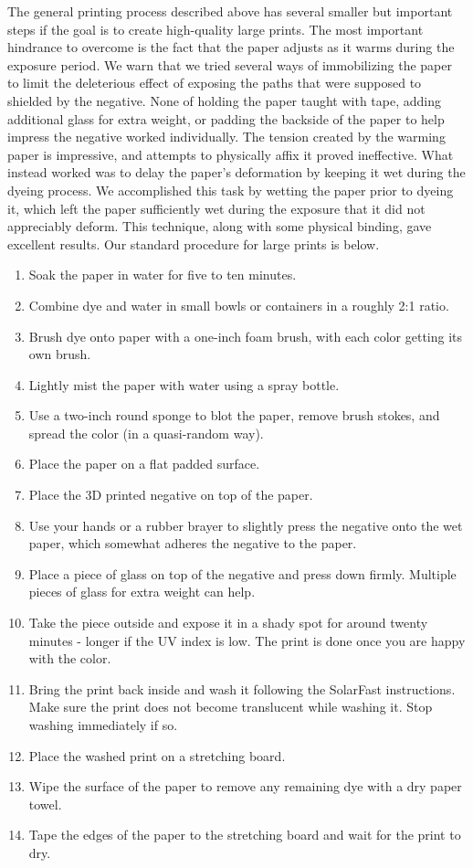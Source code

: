 \documentclass{article}
\begin{document}
The general printing process described above has several smaller but important steps
if the goal is to create high-quality large prints. The most important hindrance to
overcome is the fact that the paper adjusts as it warms during the exposure period.
We warn that we tried several ways of immobilizing the paper to limit the deleterious 
effect of exposing the paths that were supposed to shielded by the negative. None of
holding the paper taught with tape, adding additional glass for extra weight, or 
padding the backside of the paper to help impress the negative worked individually.
The tension created by the warming paper is impressive, and attempts to physically 
affix it proved ineffective. What instead worked was to delay the paper's
deformation by keeping it wet during the dyeing process. We accomplished this task
by wetting the paper prior to dyeing it, which left the paper sufficiently wet
during the exposure that it did not appreciably deform. This technique, along with
some physical binding, gave excellent results. Our standard procedure for large prints is below.
\begin{enumerate}
    \item Soak the paper in water for five to ten minutes.
    \item Combine dye and water in small bowls or containers in a roughly 2:1 ratio.
    \item Brush dye onto paper with a one-inch foam brush, with each color getting its own brush.
    \item Lightly mist the paper with water using a spray bottle.
    \item Use a two-inch round sponge to blot the paper, remove brush stokes, and 
        spread the color (in a quasi-random way).
    \item Place the paper on a flat padded surface.
    \item Place the 3D printed negative on top of the paper.
    \item Use your hands or a rubber brayer to slightly press the negative onto the wet paper,
        which somewhat adheres the negative to the paper.
    \item Place a piece of glass on top of the negative and press down firmly. 
        Multiple pieces of glass for extra weight can help.
    \item Take the piece outside and expose it in a shady spot for around twenty minutes - longer
        if the UV index is low. The print is done once you are happy with the color.
    \item Bring the print back inside and wash it following the SolarFast instructions. 
        Make sure the print does not become translucent while washing it. Stop washing 
        immediately if so.
    \item Place the washed print on a stretching board.
    \item Wipe the surface of the paper to remove any remaining dye with a dry paper towel.
    \item Tape the edges of the paper to the stretching board and wait for the print to dry.
\end{enumerate}
\end{document}
